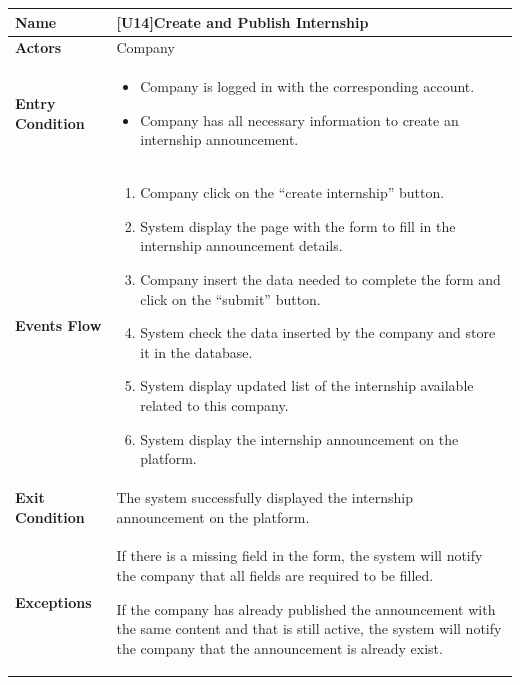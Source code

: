 \begin{center}
    \begin{tabular}{|p{9em}|p{27em}|}
        \hline
        \rowcolor{bluepoli!40} %
        \textbf{Name} & \textbf{[U14]Create and Publish Internship} \\
        \hline
        \textbf{Actors} & Company \\
        \hline
        \textbf{Entry Condition} & 
        \begin{itemize}
            \item Company is logged in with the corresponding account.
            \item Company has all necessary information to create an internship announcement.
        \end{itemize} \\
        \hline
        \textbf{Events Flow} & 
        \begin{enumerate}
            \item Company click on the ``create internship'' button.
            \item System display the page with the form to fill in the internship announcement details.
            \item Company insert the data needed to complete the form and click on the ``submit'' button.
            \item System check the data inserted by the company and store it in the database.
            \item System display updated list of the internship available related to this company.
            \item System display the internship announcement on the platform.
        \end{enumerate} \\
        \hline
        \textbf{Exit Condition} & 
         The system successfully displayed the internship announcement on the platform.\\
        \hline
        \textbf{Exceptions} &
        If there is a missing field in the form, the system will notify the company that all fields are required to be filled.

        If the company has already published the announcement with the same content and that is still active, the system will notify the company
        that the announcement is already exist.\\
        \hline
    \end{tabular}
\end{center}

